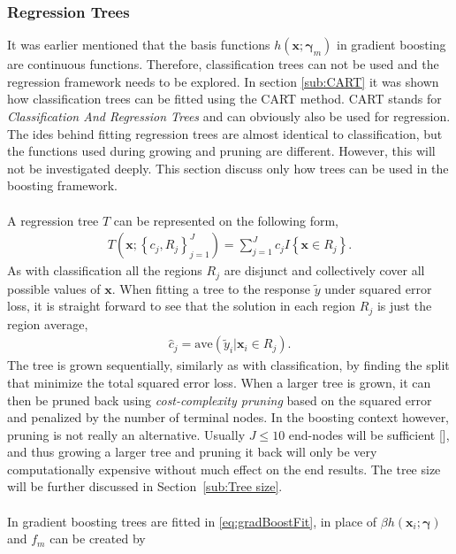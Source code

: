 \subsubsection{Regression Trees}
\label{sub:Regression Trees}
It was earlier mentioned that the basis functions $h(\mathbf{x}; \bm{\gamma}_m)$ in gradient boosting are continuous functions. Therefore, classification trees can not be used and the regression framework needs to be explored.
In section \ref{sub:CART} it was shown how classification trees can be fitted using the CART method. CART stands for \textit{Classification And Regression Trees} and can obviously also be used for regression. The ides behind fitting regression trees are almost identical to classification, but the functions used during growing and pruning are different. However, this will not be investigated deeply. This section discuss only how trees can be used in the boosting framework.\\
\\
A regression tree $T$ can be represented on the following form,
\begin{align}
  T(\mathbf{x}; \left\{ c_j, R_j \right\}_{j = 1}^J)  = \sum^{J}_{j=1} c_j I\left\{ \mathbf{x} \in R_j \right\}.
\end{align}
As with classification all the regions $R_j$ are disjunct and collectively cover all possible values of $\mathbf{x}$. 
When fitting a tree to the response $\tilde y$ under squared error loss, it is straight forward to see that the solution in each region $R_j$ is just the region average,
\begin{align}
  \hat{c}_j = \mathrm{ave}(\tilde y_i | \mathbf{x}_i \in R_j).
\end{align}
The tree is grown sequentially, similarly as with classification, by finding the split that minimize the total squared error loss. When a larger tree is grown, it can then be pruned back using \textit{cost-complexity pruning} based on the squared error and penalized by the number of terminal nodes. In the boosting context however, pruning is not really an alternative. Usually $J \leq 10$ end-nodes will be sufficient [\cite{modstat}], and thus growing a larger tree and pruning it back will only be very computationally expensive without much effect on the end results. The tree size will be further discussed in Section~\ref{sub:Tree size}.\\
\\
In gradient boosting trees are fitted in \eqref{eq:gradBoostFit}, in place of $\beta h(\mathbf{x}_i; \bm{\gamma})$ and $f_m$ can be created by
